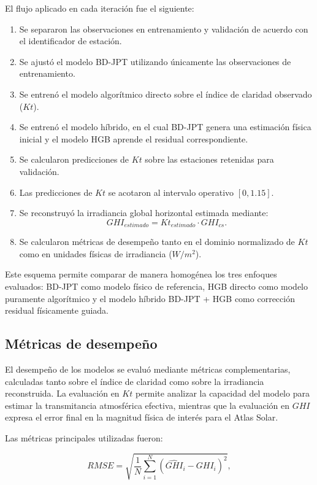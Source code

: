 \documentclass[../main.tex]{subfiles}
\begin{document}
El flujo aplicado en cada iteración fue el siguiente:


\begin{enumerate}
\item Se separaron las observaciones en entrenamiento y validación de acuerdo con el identificador de estación.
\item Se ajustó el modelo BD-JPT utilizando únicamente las observaciones de entrenamiento.
\item Se entrenó el modelo algorítmico directo sobre el índice de claridad observado ($Kt$).
\item Se entrenó el modelo híbrido, en el cual BD-JPT genera una estimación física inicial y el modelo HGB aprende el residual correspondiente.
\item Se calcularon predicciones de $Kt$ sobre las estaciones retenidas para validación.
\item Las predicciones de $Kt$ se acotaron al intervalo operativo $[0, 1.15]$.
\item Se reconstruyó la irradiancia global horizontal estimada mediante:
\begin{equation}
GHI_{estimado} = Kt_{estimado} \cdot GHI_{cs}.
\end{equation}
\item Se calcularon métricas de desempeño tanto en el dominio normalizado de $Kt$ como en unidades físicas de irradiancia ($W/m^2$).
\end{enumerate}

Este esquema permite comparar de manera homogénea los tres enfoques evaluados: BD-JPT como modelo físico de referencia, HGB directo como modelo puramente algorítmico y el modelo híbrido BD-JPT + HGB como corrección residual físicamente guiada.

\subsection{Métricas de desempeño}

El desempeño de los modelos se evaluó mediante métricas complementarias, calculadas tanto sobre el índice de claridad como sobre la irradiancia reconstruida. La evaluación en $Kt$ permite analizar la capacidad del modelo para estimar la transmitancia atmosférica efectiva, mientras que la evaluación en $GHI$ expresa el error final en la magnitud física de interés para el Atlas Solar.

Las métricas principales utilizadas fueron:

\begin{equation}
RMSE =
\sqrt{
\frac{1}{N}
\sum_{i=1}^{N}
\left(
\hat{GHI}_i - GHI_i
\right)^2
},
\end{equation}
\end{document}
